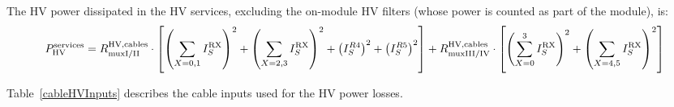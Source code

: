The HV power dissipated in the HV services, excluding the on-module HV filters (whose power is counted
as part of the module), is:
\def\phvservices{P^\text{services}_\text{HV}}
\[
\phvservices = \rhvmuxI \cdot \left[ \left(\sum_{X=0,1} I^\text{RX}_S\right)^2
                                    +\left(\sum_{X=2,3} I^\text{RX}_S\right)^2
                                    +\left(I^{R4}_S\right)^2
                                    +\left(I^{R5}_S\right)^2
                                    \right]
               + \rhvmuxIII \cdot \left[ \left(\sum^3_{X=0} I^\text{RX}_S\right)^2
                                        +\left(\sum_{X=4,5} I^\text{RX}_S\right)^2
                                        \right]
\]

Table~\ref{cableHVInputs} describes the cable inputs used for the HV power losses.

